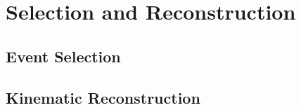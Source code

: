 \chapter{Selection and Reconstruction}
\label{sec:selection}

\section{Event Selection}

\section{Kinematic Reconstruction}

